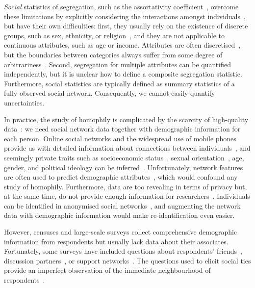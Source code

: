 \documentclass{scrartcl}
\begin{document}
\emph{Social} statistics of segregation, such as the assortativity coefficient~\cite{Newman2003a}, overcome these limitations by explicitly considering the interactions amongst individuals~\cite{Blumenstock2013}, but have their own difficulties: first, they usually rely on the existence of discrete groups, such as sex, ethnicity, or religion~\cite{Bojanowski2014}, and they are not applicable to continuous attributes, such as age or income. Attributes are often discretised~\cite{Lam-Morgan2012, Kalmijn2007, Kim2012}, but the boundaries between categories always suffer from some degree of arbitrariness~\cite{Reardon2004}. Second, segregation for multiple attributes can be quantified independently, but it is unclear how to define a composite segregation statistic. Furthermore, social statistics are typically defined as summary statistics of a fully-observed social network. Consequently, we cannot easily quantify uncertainties.

In practice, the study of homophily is complicated by the scarcity of high-quality data~\cite{Butts2012, Blumenstock2013}: we need social network data together with demographic information for each person. Online social networks and the widespread use of mobile phones provide us with detailed information about connections between individuals~\cite{Golder2014}, and seemingly private traits such as socioeconomic status~\cite{Blumenstock2015, Luo2017}, sexual orientation~\cite{Wang2017}, age, gender, and political ideology can be inferred~\cite{Kosinski2013}. Unfortunately, network features are often used to predict demographic attributes~\cite{Wang2013,Blumenstock2015,Luo2017,Kosinski2013}, which would confound any study of homophily. Furthermore, data are too revealing in terms of privacy but, at the same time, do not provide enough information for researchers~\cite{Golder2014}. Individuals can be identified in anonymised social networks~\cite{Backstrom2011, Narayanan2008}, and augmenting the network data with demographic information would make re-identification even easier.

However, censuses and large-scale surveys collect comprehensive demographic information from respondents but usually lack data about their associates. Fortunately, some surveys have included questions about respondents' friends~\cite{Huckfeldt1983, Johnson1989}, discussion partners~\cite{Marsden1987, McPherson2006}, or support networks~\cite{Kalmijn2007, Banerjee2013}. The questions used to elicit social ties provide an imperfect observation of the immediate neighbourhood of respondents~\cite{Marin2004,Eagle2015,Eveland-Jr.2017}.
\end{document}
